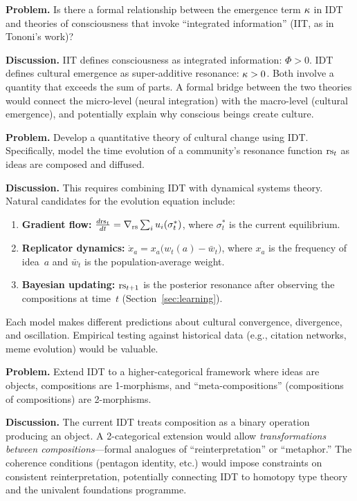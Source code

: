 \begin{game}
\label{op:consciousness}
\textbf{Problem.}  Is there a formal relationship between the
emergence term $\kappa$ in IDT and theories of consciousness
that invoke ``integrated information'' (IIT, as in Tononi's work)?

\textbf{Discussion.}  IIT defines consciousness as integrated
information: $\Phi > 0$.  IDT defines cultural emergence as
super-additive resonance: $\kappa > 0$.  Both involve a
quantity that exceeds the sum of parts.  A formal bridge between
the two theories would connect the micro-level (neural
integration) with the macro-level (cultural emergence), and
potentially explain why conscious beings create culture.
\end{game}

\begin{game}
\label{op:cultural-dynamics}
\textbf{Problem.}  Develop a quantitative theory of cultural
change using IDT.  Specifically, model the time evolution of
a community's resonance function $\mathrm{rs}_t$ as ideas are composed
and diffused.

\textbf{Discussion.}  This requires combining IDT with
dynamical systems theory.  Natural candidates for the evolution
equation include:
\begin{enumerate}
  \item \textbf{Gradient flow:}
    $\frac{d\mathrm{rs}_t}{dt} = \nabla_{\mathrm{rs}} \sum_i u_i(\sigma^*_t)$,
    where $\sigma^*_t$ is the current equilibrium.
  \item \textbf{Replicator dynamics:}
    $\dot{x}_a = x_a\bigl(w_t(a) - \bar{w}_t\bigr)$, where
    $x_a$ is the frequency of idea~$a$ and $\bar{w}_t$ is the
    population-average weight.
  \item \textbf{Bayesian updating:} $\mathrm{rs}_{t+1}$ is the posterior
    resonance after observing the compositions at time~$t$
    (Section~\ref{sec:learning}).
\end{enumerate}
Each model makes different predictions about cultural convergence,
divergence, and oscillation.  Empirical testing against historical
data (e.g., citation networks, meme evolution) would be valuable.
\end{game}

\begin{game}
\label{op:higher-categories}
\textbf{Problem.}  Extend IDT to a higher-categorical framework
where ideas are objects, compositions are 1-morphisms, and
``meta-compositions'' (compositions of compositions) are
2-morphisms.

\textbf{Discussion.}  The current IDT treats composition as a
binary operation producing an object.  A 2-categorical extension
would allow \emph{transformations between compositions}---formal
analogues of ``reinterpretation'' or ``metaphor.''  The coherence
conditions (pentagon identity, etc.) would impose constraints on
consistent reinterpretation, potentially connecting IDT to
homotopy type theory and the univalent foundations programme.
\end{game}

